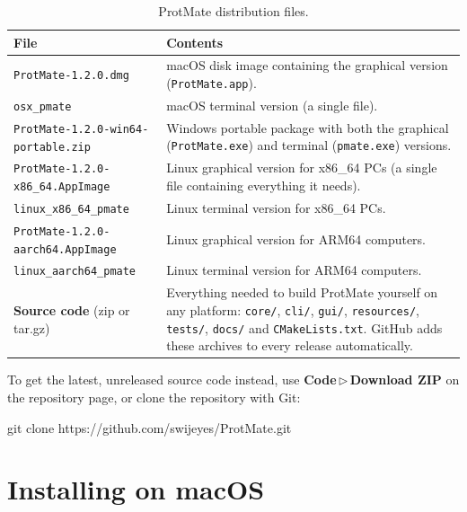 \documentclass[11pt,a4paper,oneside]{report}
\newcommand{\pmversion}{1.2.0}
\newcommand{\cmd}[1]{\texttt{#1}}            %
\newcommand{\gui}[1]{\textsf{\textbf{#1}}}  %
\begin{document}
\begin{table}[htbp]\centering\small
\caption{ProtMate distribution files.}
\begin{tabularx}{\linewidth}{@{}lX@{}}
\toprule
\textbf{File} & \textbf{Contents} \\ \midrule
\cmd{ProtMate-\pmversion.dmg} & macOS disk image containing the graphical version
                                (\cmd{ProtMate.app}). \\
\cmd{osx\_pmate} & macOS terminal version (a single file). \\
\cmd{ProtMate-\pmversion-win64-portable.zip} & Windows portable package with both the graphical
                                (\cmd{ProtMate.exe}) and terminal (\cmd{pmate.exe}) versions. \\
\cmd{ProtMate-\pmversion-x86\_64.AppImage} & Linux graphical version for x86\_64 PCs (a single
                                file containing everything it needs). \\
\cmd{linux\_x86\_64\_pmate} & Linux terminal version for x86\_64 PCs. \\
\cmd{ProtMate-\pmversion-aarch64.AppImage} & Linux graphical version for ARM64 computers. \\
\cmd{linux\_aarch64\_pmate} & Linux terminal version for ARM64 computers. \\
\gui{Source code} (zip or tar.gz) & Everything needed to build ProtMate yourself on any
                                platform: \cmd{core/}, \cmd{cli/}, \cmd{gui/}, \cmd{resources/},
                                \cmd{tests/}, \cmd{docs/} and \cmd{CMakeLists.txt}. GitHub adds
                                these archives to every release automatically. \\
\bottomrule
\end{tabularx}
\end{table}

To get the latest, unreleased source code instead, use \gui{Code}\,$\triangleright$\,\gui{Download
ZIP} on the repository page, or clone the repository with Git:

\begin{terminal}
git clone https://github.com/swijeyes/ProtMate.git
\end{terminal}

\chapter{Installing on macOS}\label{ch:mac}
\end{document}
